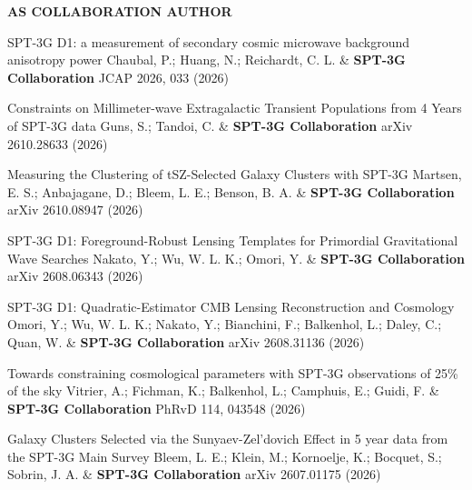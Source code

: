 \begin{footnotesize}
    \textsf{\textbf{ AS COLLABORATION AUTHOR }}
\end{footnotesize}
\begin{etaremune}[topsep=0pt,itemsep=0pt,partopsep=0pt,parsep=0pt]
    \renewcommand\labelenumi{\footnotesize\bfseries\theenumi.}

            {SPT-3G D1: a measurement of secondary cosmic microwave background anisotropy power}
            {Chaubal, P.; Huang, N.; Reichardt, C. L. \& \textbf{SPT-3G Collaboration}}
            {JCAP 2026, 033 (2026)}

            {Constraints on Millimeter-wave Extragalactic Transient Populations from 4 Years of SPT-3G data}
            {Guns, S.; Tandoi, C. \& \textbf{SPT-3G Collaboration}}
            {arXiv 2610.28633 (2026)}

            {Measuring the Clustering of tSZ-Selected Galaxy Clusters with SPT-3G}
            {Martsen, E. S.; Anbajagane, D.; Bleem, L. E.; Benson, B. A. \& \textbf{SPT-3G Collaboration}}
            {arXiv 2610.08947 (2026)}

            {SPT-3G D1: Foreground-Robust Lensing Templates for Primordial Gravitational Wave Searches}
            {Nakato, Y.; Wu, W. L. K.; Omori, Y. \& \textbf{SPT-3G Collaboration}}
            {arXiv 2608.06343 (2026)}

            {SPT-3G D1: Quadratic-Estimator CMB Lensing Reconstruction and Cosmology}
            {Omori, Y.; Wu, W. L. K.; Nakato, Y.; Bianchini, F.; Balkenhol, L.; Daley, C.; Quan, W. \& \textbf{SPT-3G Collaboration}}
            {arXiv 2608.31136 (2026)}

            {Towards constraining cosmological parameters with SPT-3G observations of 25\% of the sky}
            {Vitrier, A.; Fichman, K.; Balkenhol, L.; Camphuis, E.; Guidi, F. \& \textbf{SPT-3G Collaboration}}
            {PhRvD 114, 043548 (2026)}

            {Galaxy Clusters Selected via the Sunyaev-Zel'dovich Effect in 5 year data from the SPT-3G Main Survey}
            {Bleem, L. E.; Klein, M.; Kornoelje, K.; Bocquet, S.; Sobrin, J. A. \& \textbf{SPT-3G Collaboration}}
            {arXiv 2607.01175 (2026)}


\end{etaremune}
